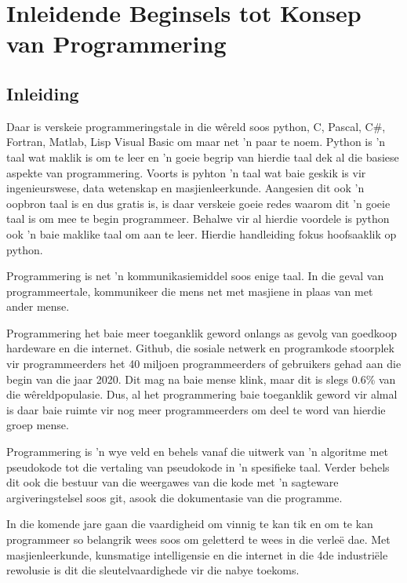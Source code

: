 


\part[Inleidende Beginsels]
{Inleidende Beginsels tot Konsep\\ van Programmering}

\chapter[Inleiding]
{Inleiding}

Daar is verskeie programmeringstale in die w\^ereld soos python, C, Pascal, C\#, Fortran, Matlab, Lisp Visual Basic om maar net 'n paar te noem.  Python is 'n taal wat maklik is om te leer en 'n goeie begrip van hierdie taal dek al die basiese aspekte van programmering.  Voorts is pyhton 'n taal wat baie geskik is vir ingenieurswese, data wetenskap en masjienleerkunde.  Aangesien dit ook 'n oopbron taal is en dus gratis is, is daar verskeie goeie redes waarom dit 'n goeie taal is om mee te begin programmeer.  Behalwe vir al hierdie voordele is python ook 'n baie maklike taal om aan te leer.  Hierdie handleiding fokus hoofsaaklik op python.

Programmering is net 'n kommunikasiemiddel soos enige taal.  In die geval van programmeertale, kommunikeer die mens net met masjiene in plaas van met ander mense.

Programmering het baie meer toeganklik geword onlangs as gevolg van goedkoop hardeware en die internet.  Github, die sosiale netwerk en programkode stoorplek vir programmeerders het 40 miljoen programmeerders of gebruikers gehad aan die begin van die jaar 2020.  Dit mag na baie mense klink, maar dit is slegs 0.6\% van die w\^ereldpopulasie.  Dus, al het programmering baie toeganklik geword vir almal is daar baie ruimte vir nog meer programmeerders om deel te word van hierdie groep mense.

Programmering is 'n wye veld en behels vanaf die uitwerk van 'n algoritme met pseudokode tot die vertaling van pseudokode in 'n spesifieke taal. Verder behels dit ook die bestuur van die weergawes van die kode met 'n sagteware argiveringstelsel soos git, asook die dokumentasie van die programme.

In die komende jare gaan die vaardigheid om vinnig te kan tik en om te kan programmeer so belangrik wees soos om geletterd te wees in die verle\"e dae.  Met masjienleerkunde, kunsmatige intelligensie en die internet in die 4de industri\"ele rewolusie is dit die sleutelvaardighede vir die nabye toekoms.

